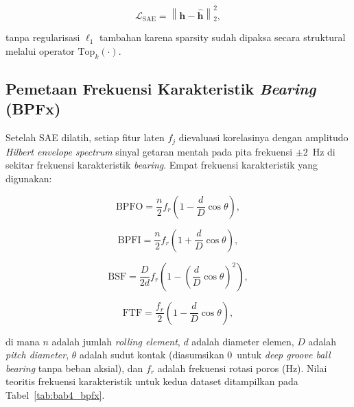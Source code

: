 \begin{equation}\label{eq:bab4_sae_loss}
\mathcal{L}_{\text{SAE}} = \left\|\mathbf{h} - \hat{\mathbf{h}}\right\|_{2}^{2},
\end{equation}

\noindent tanpa regularisasi $\ell_1$ tambahan karena sparsity sudah
dipaksa secara struktural melalui operator $\text{Top}_{k}(\cdot)$.

\subsection{Pemetaan Frekuensi Karakteristik \emph{Bearing} (BPFx)}
\label{subsec:bab4_bpfx}

Setelah SAE dilatih, setiap fitur laten $f_j$ dievaluasi korelasinya
dengan amplitudo \emph{Hilbert envelope spectrum} sinyal getaran mentah
pada pita frekuensi $\pm 2$~Hz di sekitar frekuensi karakteristik
\emph{bearing}.
Empat frekuensi karakteristik yang digunakan:

\begin{equation}\label{eq:bab4_bpfo}
\text{BPFO} = \frac{n}{2} f_{r} \left(1 - \frac{d}{D}\cos\theta\right),
\end{equation}

\begin{equation}\label{eq:bab4_bpfi}
\text{BPFI} = \frac{n}{2} f_{r} \left(1 + \frac{d}{D}\cos\theta\right),
\end{equation}

\begin{equation}\label{eq:bab4_bsf}
\text{BSF} = \frac{D}{2d} f_{r} \left(1 - \left(\frac{d}{D}\cos\theta\right)^{2}\right),
\end{equation}

\begin{equation}\label{eq:bab4_ftf}
\text{FTF} = \frac{f_{r}}{2} \left(1 - \frac{d}{D}\cos\theta\right),
\end{equation}

\noindent di mana $n$ adalah jumlah \emph{rolling element}, $d$ adalah
diameter elemen, $D$ adalah \emph{pitch diameter}, $\theta$ adalah
sudut kontak (diasumsikan 0\textdegree\ untuk \emph{deep groove ball
bearing} tanpa beban aksial), dan $f_{r}$ adalah frekuensi rotasi
poros (Hz).
Nilai teoritis frekuensi karakteristik untuk kedua dataset ditampilkan
pada Tabel~\ref{tab:bab4_bpfx}.

